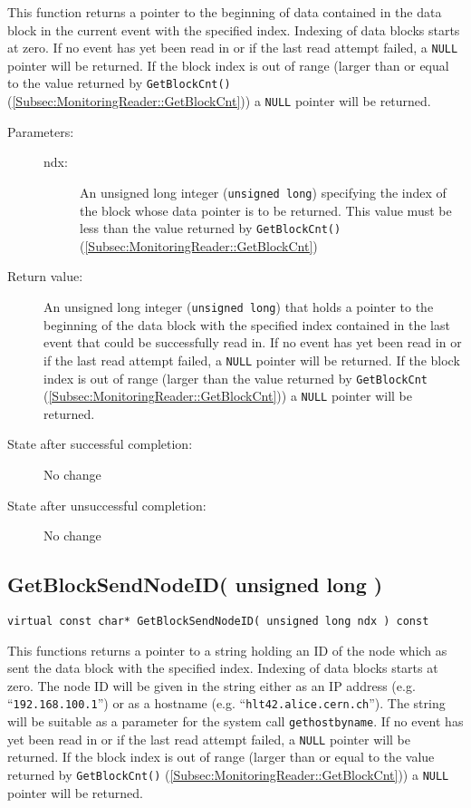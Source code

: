 \documentclass[a4paper,twoside]{article}
\begin{document}
This function returns a pointer to the beginning of data contained in the data block in the current event with the specified index. 
Indexing of data blocks starts at zero.
If no event has yet been read in or if the last read attempt failed, a \texttt{NULL} pointer will be returned.
If the block index is out of range (larger than or equal to the value returned by \texttt{GetBlockCnt()} (\ref{Subsec:MonitoringReader::GetBlockCnt}))
a \texttt{NULL} pointer will be returned.

\begin{description}
\item[Parameters:]
	\begin{description}
		\item[ndx:] An unsigned long integer (\texttt{unsigned long}) specifying the index of the block whose data pointer is 
		to be returned. This value must be less than the value returned by \texttt{GetBlockCnt()} (\ref{Subsec:MonitoringReader::GetBlockCnt})
	\end{description}
\item[Return value:] An  unsigned long integer (\texttt{unsigned long}) that holds a pointer to the beginning of the data block
with the specified index contained in the last event that could be successfully read in. 
If no event has yet been read in or if the last read attempt failed, a \texttt{NULL} pointer will be returned.
If the block index is out of range (larger than the value returned by \texttt{GetBlockCnt} (\ref{Subsec:MonitoringReader::GetBlockCnt}))
a \texttt{NULL} pointer will be returned.
\item[State after successful completion:] No change
\item[State after unsuccessful completion:] No change
\end{description}


\subsection{GetBlockSendNodeID( unsigned long )}
\label{Subsec:MonitoringReader::GetBlockSendNodeID}
\texttt{virtual const char* GetBlockSendNodeID( unsigned long ndx ) const}

This functions returns a pointer to a string holding an ID of the node which as sent the data block with the specified index. 
Indexing of data blocks starts at zero. The node ID will be given in the string either as an IP address (e.g. ``\texttt{192.168.100.1}'')
or as a hostname (e.g. ``\texttt{hlt42.alice.cern.ch}''). The string will be suitable as a parameter for the system call \texttt{gethostbyname}.
If no event has yet been read in or if the last read attempt failed, a \texttt{NULL} pointer will be returned.
If the block index is out of range (larger than or equal to the value returned by \texttt{GetBlockCnt()} (\ref{Subsec:MonitoringReader::GetBlockCnt}))
a \texttt{NULL} pointer will be returned.
\end{document}
